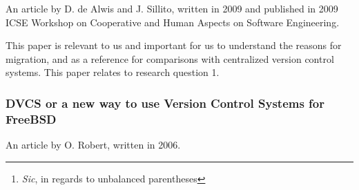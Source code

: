 \documentclass{article}
\begin{document}
An article by D. de Alwis and J. Sillito, written in 2009 and published in 
2009 ICSE Workshop on Cooperative and Human Aspects on Software
Engineering\cite{alwis09}.

\begin{abstract}
 Version control systems are essential for co-ordinating work on a software
 project. A number of open- and closed-source projects are proposing to
 move, or have already moved, their source code repositories from a
 centralized version control system (CVCS) to a decentralized version
 control system (DVCS). In this paper we summarize the differences between a
 CVCS and a DVCS, and describe some of the rationales and perceived benefits
 offered by projects to justify the transition.
\end{abstract}

This paper is relevant to us and important for us to understand the reasons
for migration, and as a reference for comparisons with centralized version 
control systems. This paper relates to research question 1.

\subsubsection{DVCS or a new way to use Version Control Systems for FreeBSD}

An article by O. Robert, written in 2006\cite{robert06}.

\begin{abstract}
 FreeBSD, like many open source projects, uses CVS as its main versioon
 control system (VCS), which is an extended history of all modifications
 made since the beginning of the project in 1993. CVS is a cornerstone of
 FreeBSD in two ways: not only does it record the history of the project,
 but it is a fundamental tool for coordinating the development of the
 FreeBSD operating system.

 CVS is built around the concept of centralised repository, which has a
 number of limitations.

 Recently, a new type of VCS has arisen: Distributed VCS, one of the first
 being BK from BitMover, Inc. Better known from the controversy it generated
 when Linus Torvalds started using it, it has nonetheless changed the way
 some people develop software.

 This paper explores the area of distributed VCS. We analyse two of them
 (Arch in its Bazaar incarnation and Mercuriel and try to show how such a
 tool could help further FreeBSD development, both as a tool and as a new
 development process.\footnote{
  \emph{Sic}, in regards to unbalanced parentheses
 }
\end{abstract}
\end{document}
